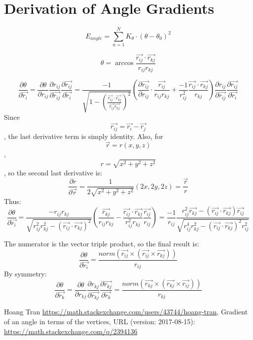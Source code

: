 \section{Derivation of Angle Gradients}
\[E_{angle}=\sum_{n=1}^{N}K_{\theta}\cdot(\theta-\theta_{0})^2\]



\[\theta=\arccos{\frac{\vec{r_{ij}}\cdot\vec{r_{kj}}}{r_{ij} r_{kj}}}\]

\[\frac{\partial \theta}{\partial \vec{r_{i}}}=\frac{\partial \theta}{\partial r_{ij}}\frac{\partial r_{ij}}{\partial \vec{r_{ij}}}\frac{\partial \vec{r_{ij}}}{\partial \vec{r_{i}}}=\frac{-1}{\sqrt{1-(\frac{\vec{r_{ij}}\cdot\vec{r_{kj}}}{\vec{r_{ij}}\vec{r_{kj}}})^2}}(\frac{\partial \vec{r_{ij}}}{\partial r_{ij}}\cdot\frac{\vec{r_{ij}}}{r_{ij}r_{kj}}+\frac{-1}{r_{ij}^2}{\frac{\vec{r_{ij}}\cdot\vec{r_{kj}}}{r_{kj}}})\frac{\partial r_{ij}}{\partial \vec{r_{ij}}}\frac{\partial \vec{r_{ij}}}{\partial \vec{r_{i}}}\]
Since \[\vec{r_{ij}}=\vec{r_{i}}-\vec{r_{j}}\], the last derivative term is simply identity. Also, for \[\vec{r}=r(x,y,z)\],\[r=\sqrt{x^2+y^2+z^2}\], so the second last derivative is:
\[\frac{\partial r}{\partial \vec{r}}=\frac{1}{2\sqrt{x^2+y^2+z^2}}(2x, 2y,2z)=\frac{\vec{r}}{r}\]
Thus:
\[\frac{\partial \theta}{\partial \vec{r_{i}}}=\frac{-r_{ij}r_{kj}}{\sqrt{r_{ij}^2 r_{kj}^2-(\vec{r_{ij}}\cdot{\vec{r_{kj}}})^2}}(\frac{\vec{r_{kj}}}{r_{ij}r_{kj}}-\frac{\vec{r_{ij}}\cdot\vec{r_{kj}}}{r_{ij}^2 r_{kj}}\frac{\vec{r_{ij}}}{r_{ij}})\allowbreak =\frac{-1}{r_{ij}}\frac{r_{ij}^2 \vec{r_{kj}}-(\vec{r_{ij}}\cdot\vec{r_{kj}})\vec{r_{ij}}}{\sqrt{r_{ij}^4 r_{kj}^2-(\vec{r_{ij}}\cdot\vec{r_{kj}})^2 r_{ij}^2}}\]

The numerator is the vector triple product, so the final result is:
\[\frac{\partial \theta}{\partial \vec{r_{i}}}=\frac{norm(\vec{r_{ij}} \times (\vec{r_{ij}} \times \vec{r_{kj}}))}{r_{ij}}\]
By symmetry:
\[\frac{\partial \theta}{\partial \vec{r_{k}}}=\frac{\partial \theta}{\partial r_{kj}}\frac{\partial r_{kj}}{\partial \vec{r_{kj}}}\frac{\partial \vec{r_{kj}}}{\partial \vec{r_{k}}}=\frac{norm(\vec{r_{kj}} \times (\vec{r_{kj}} \times \vec{r_{ij}}))}{r_{kj}}\]

Hoang Tran \url{https://math.stackexchange.com/users/43744/hoang-tran}, Gradient of an angle in terms of the vertices, URL (version: 2017-08-15): \url{https://math.stackexchange.com/q/2394136}
